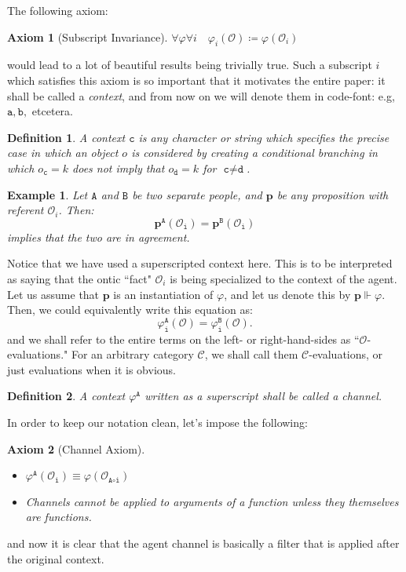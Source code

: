 \documentclass{article}
\newtheorem{dn}{Definition}
\newtheorem{eg}{Example}
\newtheorem{ax}{Axiom}
\numberwithin{tm}{section}
\numberwithin{dn}{section}
\numberwithin{as}{section}
\numberwithin{rk}{section}
\numberwithin{lem}{section}
\numberwithin{ax}{section}
\numberwithin{pp}{section}
\numberwithin{eg}{section}
\numberwithin{war}{section}
\numberwithin{equation}{section}
\numberwithin{prop}{section}
\numberwithin{nt}{section}
\numberwithin{rc}{section}
\def\code#1{\texttt{#1}}
\begin{document}
\medskip
The following axiom:
\begin{ax} [Subscript Invariance] \label{subinv}
	$\forall \varphi \forall i \quad \varphi_i(\mathcal{O}) \coloneq \varphi(\mathcal{O}_i)$
\end{ax}
would lead to a lot of beautiful results being trivially true. Such a subscript $i$ which satisfies this axiom is so important that it motivates the entire paper: it shall be called a \emph{context}, and from now on we will denote them in code-font: e.g, $\code{a}, \code{b},$ etcetera. 

\begin{dn} \label{dn:contexts}
	A context $\code{c}$ is any character or string which specifies the precise case in which an object $o$ is considered by creating a conditional branching in which $o_\code{c} = k$ does not imply that $o_\code{d} = k$ for $\code{c} \neq \code{d}$.
\end{dn}

\begin{eg}
	Let $\code{A}$ and $\code{B}$ be two separate people, and $\mathbf{p}$ be any proposition with referent $\mathcal{O}_i$. Then:
	\begin{equation}
		\mathbf{p}^\code{A}(\mathcal{O}_\code{i}) = \mathbf{p}^\code{B}(\mathcal{O}_\code{i})
	\end{equation}
	implies that the two are in agreement.
\end{eg}
Notice that we have used a superscripted context here. This is to be interpreted as saying that the ontic ``fact" $\mathcal{O}_i$ is being specialized to the context of the agent. Let us assume that $\mathbf{p}$ is an instantiation of $\varphi$, and let us denote this by $\mathbf{p} \Vdash \varphi$. Then, we could equivalently write this equation as:
\begin{equation}
	\varphi_{\code{i}}^\code{A}(\mathcal{O}) = \varphi_{\code{i}}^\code{B}(\mathcal{O}) .
\end{equation}
and we shall refer to the entire terms on the left- or right-hand-sides as ``$\mathcal{O}$-evaluations." For an arbitrary category $\mathcal{C}$, we shall call them $\mathcal{C}$-evaluations, or just evaluations when it is obvious. 

\begin{dn}
	A context $\varphi^\code{A}$ written as a superscript shall be called a \emph{channel}.
\end{dn}

In order to keep our notation clean, let's impose the following:
\begin{ax} [Channel Axiom] \label{Channel}
	\begin{itemize}
		
		\item $\varphi^\code{A}(\mathcal{O}_\code{i}) \equiv \varphi(\mathcal{O}_{\code{A} \circ \code{i}})$
		
		\item Channels cannot be applied to arguments of a function unless they themselves are functions.
	\end{itemize}
\end{ax}
and now it is clear that the agent channel is basically a filter that is applied after the original context. 
\end{document}

